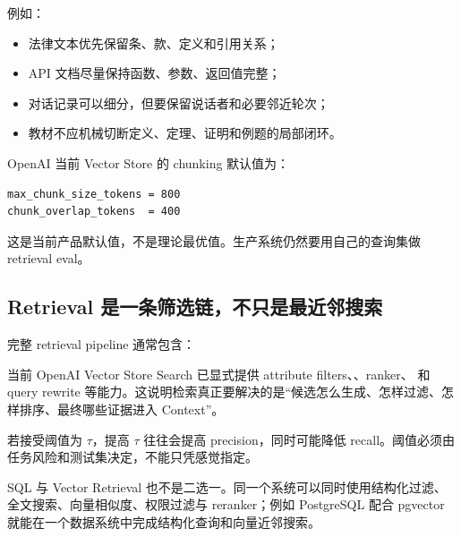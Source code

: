\documentclass[profile=standard,twoside=false]{ipara-handbook}
\begin{document}
例如：

\begin{itemize}
  \item 法律文本优先保留条、款、定义和引用关系；
  \item API 文档尽量保持函数、参数、返回值完整；
  \item 对话记录可以细分，但要保留说话者和必要邻近轮次；
  \item 教材不应机械切断定义、定理、证明和例题的局部闭环。
\end{itemize}

OpenAI 当前 Vector Store 的  chunking 默认值为：

\begin{lstlisting}
max_chunk_size_tokens = 800
chunk_overlap_tokens  = 400
\end{lstlisting}

这是当前产品默认值，不是理论最优值。生产系统仍然要用自己的查询集做 retrieval eval。

\subsection{Retrieval 是一条筛选链，不只是最近邻搜索}

完整 retrieval pipeline 通常包含：

\begin{processchain}
\end{processchain}

当前 OpenAI Vector Store Search 已显式提供 attribute filters、、ranker、 和 query rewrite 等能力。这说明检索真正要解决的是“候选怎么生成、怎样过滤、怎样排序、最终哪些证据进入 Context”。

若接受阈值为 $\tau$，提高 $\tau$ 往往会提高 precision，同时可能降低 recall。阈值必须由任务风险和测试集决定，不能只凭感觉指定。

SQL 与 Vector Retrieval 也不是二选一。同一个系统可以同时使用结构化过滤、全文搜索、向量相似度、权限过滤与 reranker；例如 PostgreSQL 配合 pgvector 就能在一个数据系统中完成结构化查询和向量近邻搜索。
\end{document}

